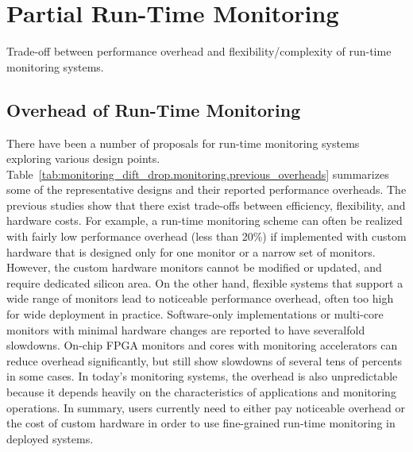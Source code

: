 \section{Partial Run-Time Monitoring}
\label{sec:monitoring_dift_drop.monitoring}

\begin{table}
  \begin{center}
    \begin{footnotesize}
    
    \end{footnotesize}
    \caption{Trade-off between performance overhead and flexibility/complexity
    of run-time monitoring systems.}
    \label{tab:monitoring_dift_drop.monitoring.previous_overheads}
  \end{center}
\end{table}

\subsection{Overhead of Run-Time Monitoring}

There have been a number of proposals for run-time monitoring systems exploring
various design points.
Table~\ref{tab:monitoring_dift_drop.monitoring.previous_overheads} summarizes
some of the representative designs and their reported performance overheads.
The previous studies show that there exist trade-offs between
efficiency, flexibility, and hardware costs.  For example, a run-time
monitoring scheme can often be realized with fairly low performance overhead
(less than 20\%) if implemented with custom hardware that is designed only for
one monitor or a narrow set of monitors. However, the custom hardware monitors
cannot be modified or updated, and require dedicated silicon area.  On the
other hand, flexible systems that support a wide range of monitors lead to
noticeable performance overhead, often too high for wide deployment in
practice.  Software-only implementations \cite{nagarajan-interact08,
lift-micro06, purify-usenix92, taintcheck-ndsss05} or multi-core monitors with
minimal hardware changes \cite{lba-asid06} are reported to have severalfold
slowdowns.  On-chip FPGA monitors \cite{flexcore-micro10} and cores with
monitoring accelerators \cite{lba-isca08, fade-hpca14} can reduce overhead
significantly, but still show slowdowns of several tens of percents in some
cases.  In today's monitoring systems, the overhead is also unpredictable
because it depends heavily on the characteristics of applications and
monitoring operations.  In summary, users currently need to either pay
noticeable overhead or the cost of custom hardware in order to use fine-grained
run-time monitoring in deployed systems.

